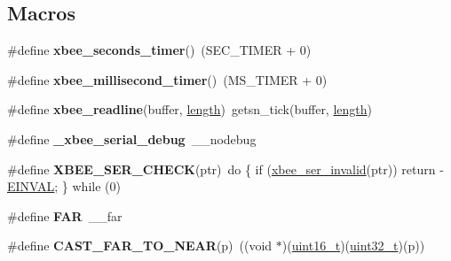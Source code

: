 \subsection*{Macros}
\begin{DoxyCompactItemize}
\item 
\mbox{\label{group__hal__rabbit_gae8fb830d9a707a0f6d60a2c480ed7dfc}} 
\#define {\bfseries xbee\+\_\+seconds\+\_\+timer}()~(S\+E\+C\+\_\+\+T\+I\+M\+ER + 0)
\item 
\mbox{\label{group__hal__rabbit_gae68dcfee6e7c24b7a401c769c3fc1dd0}} 
\#define {\bfseries xbee\+\_\+millisecond\+\_\+timer}()~(M\+S\+\_\+\+T\+I\+M\+ER + 0)
\item 
\mbox{\label{group__hal__rabbit_gab5b9fab5902286c1bb085bfd9dfe9db0}} 
\#define {\bfseries xbee\+\_\+readline}(buffer,  \hyperlink{group__zdo_gab2b3adeb2a67e656ff030b56727fd0ac}{length})~getsn\+\_\+tick(buffer, \hyperlink{group__zdo_gab2b3adeb2a67e656ff030b56727fd0ac}{length})
\item 
\mbox{\label{group__hal__rabbit_ga0d8197fec29383ae164d587e01ab2e13}} 
\#define {\bfseries \+\_\+xbee\+\_\+serial\+\_\+debug}~\+\_\+\+\_\+nodebug
\item 
\mbox{\label{group__hal__rabbit_ga755b7e850db6200a6f43b741c678ae53}} 
\#define {\bfseries X\+B\+E\+E\+\_\+\+S\+E\+R\+\_\+\+C\+H\+E\+CK}(ptr)~do \{ if (\hyperlink{group__xbee__serial_gae7f838b59f553507bf81a86042fe9cd7}{xbee\+\_\+ser\+\_\+invalid}(ptr)) return -\/\hyperlink{group__hal_ga2d1678d5a7cc8ce499643f3b8957def4}{E\+I\+N\+V\+AL}; \} while (0)
\item 
\mbox{\label{group__hal__rabbit_gaef060b3456fdcc093a7210a762d5f2ed}} 
\#define {\bfseries F\+AR}~\+\_\+\+\_\+far
\item 
\mbox{\label{group__hal__rabbit_ga0220c5cb877cc5718402ab41b91b7252}} 
\#define {\bfseries C\+A\+S\+T\+\_\+\+F\+A\+R\+\_\+\+T\+O\+\_\+\+N\+E\+AR}(p)~((void $\ast$)(\hyperlink{group__hal__dos_ga5a8b2dc9e45a9ee81a94ef304fb62505}{uint16\+\_\+t})(\hyperlink{group__hal__dos_ga09a1e304d66d35dd47daffee9731edaa}{uint32\+\_\+t})(p))
\item 

\end{DoxyCompactItemize}
